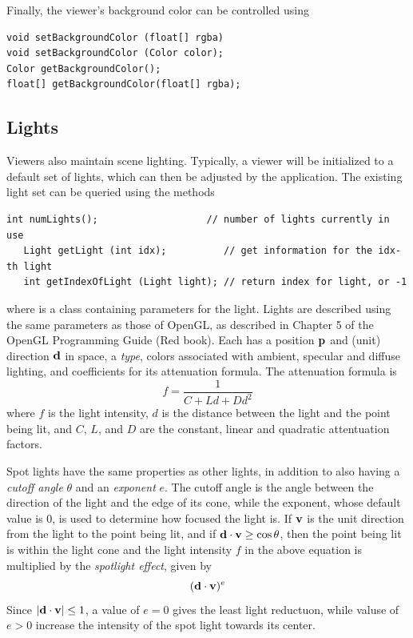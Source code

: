 Finally, the viewer's background color can be controlled using
%
\begin{lstlisting}[]
void setBackgroundColor (float[] rgba)
void setBackgroundColor (Color color);
Color getBackgroundColor();
float[] getBackgroundColor(float[] rgba);
\end{lstlisting}
%

\subsection{Lights}
\label{lights:sec}

Viewers also maintain scene lighting. Typically, a viewer will be
initialized to a default set of lights, which can then be
adjusted by the application. The existing
light set can be queried using the methods
%
\begin{lstlisting}[]
   int numLights();                   // number of lights currently in use
   Light getLight (int idx);          // get information for the idx-th light 
   int getIndexOfLight (Light light); // return index for light, or -1
\end{lstlisting}
%
where  is a class 
containing parameters for the light.
Lights are described using the same parameters as those of OpenGL,
as described in Chapter 5 of the OpenGL Programming Guide (Red book).
Each has a position ${\bf p}$ and (unit) direction $\bf d$ in space, a {\it
type}, colors associated with ambient, specular and diffuse lighting,
and coefficients for its attenuation formula. The attenuation formula
is
%
\begin{equation*}
f = \frac{1}{C + L d + D d^2}
\end{equation*}
%
where $f$ is the light intensity, $d$ is the distance between the
light and the point being lit, and $C$, $L$, and $D$ are the constant,
linear and quadratic attentuation factors. 

Spot lights have the same properties as other lights, in addition to
also having a {\it cutoff angle} $\theta$ and an {\it exponent} $e$.
The cutoff angle is the angle between the direction of the light and
the edge of its cone, while the exponent, whose default value is 0, is
used to determine how focused the light is. If $\bf{v}$ is the unit
direction from the light to the point being lit, and if $ {\bf d}
\cdot {\bf v} \ge \cos \theta $, then the point being lit is within
the light cone and the light intensity $f$ in the above equation is
multiplied by the {\it spotlight effect}, given by
%
\begin{equation*}
({\bf d} \cdot {\bf v})^e
\end{equation*}
%
Since $ |{\bf d} \cdot {\bf v}| \le 1$, a value of $e = 0$ gives
the least light reductuon, while valuse of $e > 0$ increase the
intensity of the spot light towards its center.


